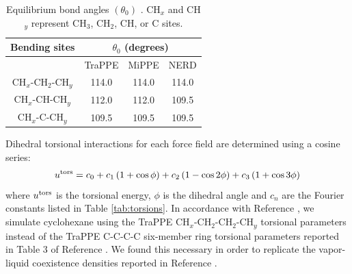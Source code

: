 \documentclass[journal=jced,manuscript=article]{achemso}
\begin{document}
    \begin{table}[h!]
		\caption{Equilibrium bond angles $(\theta_0)$ \cite{Martin1999}. CH$_x$ and CH$_y$ represent CH$_3$, CH$_2$, CH, or C sites.} \label{tab:angles}
		\begin{center}
			\begin{tabular}{|c|c|c|c|}
				\hline
				Bending sites & \multicolumn{3}{|c|}{$\theta_0$ (degrees)} \\ \hline
				& TraPPE & MiPPE & NERD \\ \hline
				CH$_x$-CH$_2$-CH$_y$ & 114.0 & 114.0 & 114.0 \\ 
				CH$_x$-CH-CH$_y$ & 112.0 & 112.0 & 109.5 \\
				CH$_x$-C-CH$_y$ & 109.5 & 109.5 & 109.5 \\
				\hline
			\end{tabular}
		\end{center} 
	\end{table}
    
    Dihedral torsional interactions for each force field are determined using a cosine series:
    \begin{equation}
    u^{\rm tors} = c_0 + c_1 \left(1+\cos{\phi}\right) + c_2 \left(1-\cos{2\phi}\right) + c_3 \left(1+\cos{3\phi}\right)
    \end{equation}
    where $u^{\rm tors}$ is the torsional energy, $\phi$ is the dihedral angle and $c_n$ are the Fourier constants listed in Table \ref{tab:torsions}. In accordance with Reference , we simulate cyclohexane using the TraPPE CH$_x$-CH$_2$-CH$_2$-CH$_y$ torsional parameters instead of the TraPPE C-C-C-C six-member ring torsional parameters reported in Table 3 of Reference . We found this necessary in order to replicate the vapor-liquid coexistence densities reported in Reference . %
    
\end{document}
